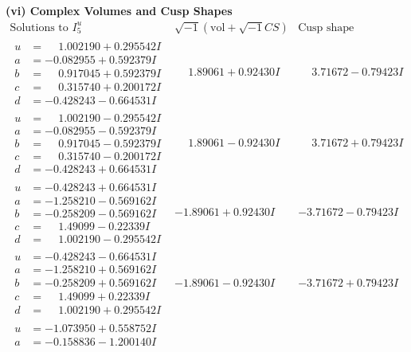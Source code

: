 \documentclass[1p]{elsarticle_modified}
\theoremstyle{definition}
\newcommand{\I}{\sqrt{-1}}
\begin{document}
\newpage\flushleft \textbf{(vi) Complex Volumes and Cusp Shapes}
$$\begin{array}{c|c|c}  
\text{Solutions to }I^u_{5}& \I (\text{vol} + \sqrt{-1}CS) & \text{Cusp shape}\\
 \hline 
\begin{aligned}
u &= \phantom{-}1.002190 + 0.295542 I \\
a &= -0.082955 + 0.592379 I \\
b &= \phantom{-}0.917045 + 0.592379 I \\
c &= \phantom{-}0.315740 + 0.200172 I \\
d &= -0.428243 - 0.664531 I\end{aligned}
 & \phantom{-}1.89061 + 0.92430 I & \phantom{-}3.71672 - 0.79423 I \\ \hline\begin{aligned}
u &= \phantom{-}1.002190 - 0.295542 I \\
a &= -0.082955 - 0.592379 I \\
b &= \phantom{-}0.917045 - 0.592379 I \\
c &= \phantom{-}0.315740 - 0.200172 I \\
d &= -0.428243 + 0.664531 I\end{aligned}
 & \phantom{-}1.89061 - 0.92430 I & \phantom{-}3.71672 + 0.79423 I \\ \hline\begin{aligned}
u &= -0.428243 + 0.664531 I \\
a &= -1.258210 - 0.569162 I \\
b &= -0.258209 - 0.569162 I \\
c &= \phantom{-}1.49099 - 0.22339 I \\
d &= \phantom{-}1.002190 - 0.295542 I\end{aligned}
 & -1.89061 + 0.92430 I & -3.71672 - 0.79423 I \\ \hline\begin{aligned}
u &= -0.428243 - 0.664531 I \\
a &= -1.258210 + 0.569162 I \\
b &= -0.258209 + 0.569162 I \\
c &= \phantom{-}1.49099 + 0.22339 I \\
d &= \phantom{-}1.002190 + 0.295542 I\end{aligned}
 & -1.89061 - 0.92430 I & -3.71672 + 0.79423 I \\ \hline\begin{aligned}
u &= -1.073950 + 0.558752 I \\
a &= -0.158836 - 1.200140 I \\

\end{aligned}
\end{array}$$
\end{document}
